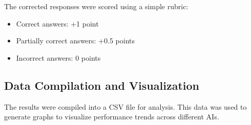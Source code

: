The corrected responses were scored using a simple rubric:
\begin{itemize}
    \item Correct answers: +1 point
    \item Partially correct answers: +0.5 points
    \item Incorrect answers: 0 points
\end{itemize}

\subsection{Data Compilation and Visualization}
The results were compiled into a CSV file for analysis. This data was used to generate graphs to visualize performance trends across different AIs.
\pagebreak